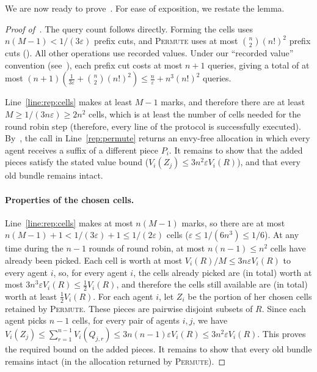 \documentclass[11pt]{article}
\newcommand{\eps}{\varepsilon}
\newcommand{\Permute}{\textsc{Permute}}
\theoremstyle{plain}
\theoremstyle{definition}
\theoremstyle{plain}
\begin{document}
We are now ready to prove~. For ease of exposition, we restate the lemma.

\repairmain*

\begin{proof}[Proof of~]

The query count follows directly. Forming the cells uses $n(M-1)<1/(3\eps)$ prefix cuts, and \Permute{} uses at most $\binom n2(n!)^2$ prefix cuts (). All other operations use recorded values. Under our ``recorded value'' convention (see~), each prefix cut costs at most $n+1$ queries, giving a total of at most $(n+1)\left(\frac{1}{3\eps}+\binom n2(n!)^2\right) \le \frac{n}{\eps}+n^3(n!)^2$ queries.

Line~\ref{line:rep:cells} makes at least $M-1$ marks, and therefore there are at least $M \geq 1/(3n \eps) \geq 2n^2$ cells, which is at least the number of cells needed for the round robin step (therefore, every line of the protocol is successfully executed). By~, the call in Line~\ref{rep:permute} returns an envy-free allocation in which every agent receives a suffix of a different piece $P_i$. It remains to show that the added pieces satisfy the stated value bound ($V_i(Z_j)\leq 3n^2\eps V_i(R)$), and that  every old bundle remains intact.


\paragraph{Properties of the chosen cells.}
Line~\ref{line:rep:cells} makes at most $n(M-1)$ marks, so there are at most $n(M-1)+1 < 1/(3\eps)+1 \leq 1/(2\eps)$ cells ($\eps\le 1/(6n^3)\le1/6$). At any time during the $n-1$ rounds of round robin, at most $n(n-1)\le n^2$ cells have already been picked. Each cell is worth at most $V_i(R)/M\le 3n\eps V_i(R)$ to every agent $i$, so, for every agent $i$, the cells already picked are (in total) worth at most $3n^3\eps V_i(R)\le \frac{1}{2} V_i(R)$, and therefore the cells still available are (in total) worth at least $\frac{1}{2}V_i(R)$. For each agent $i$, let $Z_i$ be the portion of her chosen cells retained by \Permute{}. These pieces are pairwise disjoint subsets of $R$. Since each agent picks $n-1$ cells, for every pair of agents $i,j$, we have $V_i(Z_j)\le\sum_{r=1}^{n-1}V_i(Q_{j,r}) \le3n(n-1)\eps V_i(R) \le3n^2\eps V_i(R)$.
This proves the required bound on the added pieces. It remains to show that every old bundle remains intact (in the allocation returned by \Permute{}).


\end{proof}
\end{document}
